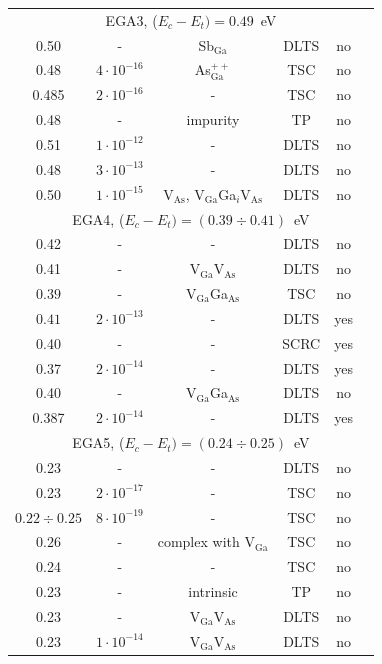 \documentclass[final,3p,times,twocolumn,authoryear]{elsarticle}
\begin{document}
\begin{table}
\begin{tabular}{cccccc}
\multicolumn{6}{c}{EGA3, ($E_c-E_t)=0.49$~eV}\\
0.50&-&Sb$_\mathrm{Ga}$&DLTS&no&\cite{Samoilov1994En}\\ %
0.48&$4\cdot10^{-16}$&As$_\mathrm{Ga}^{++}$&TSC&no&\cite{Pavlovic2000}\\ %
0.485&$2\cdot10^{-16}$&-&TSC&no&\cite{Pavlovic:GaAs}\\ %
0.48&-&impurity&TP&no&\cite{Abele:GaAs}\\ %
0.51&$1\cdot10^{-12}$&-&DLTS&no&\cite{Martin1977}\\ %
0.48&$3\cdot10^{-13}$&-&DLTS&no&\cite{Lang:GaAs}\\ %
0.50&$1\cdot10^{-15}$&V$_\mathrm{As}$, V$_\mathrm{Ga}$Ga$_i$V$_\mathrm{As}$ &DLTS&no&\cite{Pons}\\
\multicolumn{6}{c}{EGA4, ($E_c-E_t)=(0.39\div0.41)$~eV}\\
0.42&-&-&DLTS&no&\cite{Neild1991}\\ %
0.41&-&V$_\mathrm{Ga}$V$_\mathrm{As}$&DLTS&no&\cite{Samoilov1994En}\\ %
$0.39$&-&V$_\mathrm{Ga}$Ga$_\mathrm{As}$&TSC&no&\cite{FANG1990}\\ %
$0.41$&$2\cdot10^{-13}$&-&DLTS&yes&\cite{Bourgoin:GaAs}\\ %
0.40&-&-&SCRC&yes&\cite{ASHBY:GaAs}\\ %
0.37&$2\cdot10^{-14}$&-&DLTS&yes&\cite{Fang:EL6}\\ %
0.40&-&V$_\mathrm{Ga}$Ga$_\mathrm{As}$&DLTS&no&\cite{VaitkusEn}\\ %
0.387&$2\cdot10^{-14}$&-&DLTS&yes&\cite{Yousefi1995}\\ %
\multicolumn{6}{c}{EGA5, ($E_c-E_t)=(0.24\div0.25)$~eV}\\
0.23&-&-&DLTS&no&\cite{Neild1991}\\ %
0.23&$2\cdot10^{-17}$&-&TSC&no&\cite{Pavlovic2000}\\ %
$0.22\div0.25$&$8\cdot10^{-19}$&-&TSC&no&\cite{Lin:GaAs}\\ %
$0.26$&-&complex with V$_\mathrm{Ga}$&TSC&no&\cite{FANG1990}\\ %
0.24&-&-&TSC&no&\cite{Tomozane:GaAs}\\ %
0.23&-&intrinsic&TP&no&\cite{Abele:GaAs}\\ %
0.23&-&V$_\mathrm{Ga}$V$_\mathrm{As}$&DLTS&no&\cite{Morrow:EL17}\\ %
0.23&$1\cdot10^{-14}$&V$_\mathrm{Ga}$V$_\mathrm{As}$&DLTS&no&\cite{Bourgoin:GaAs}\\ %

\end{tabular}
\end{table}
\end{document}
